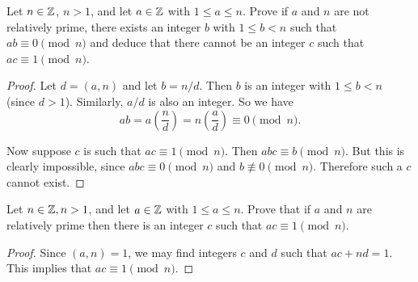    Let   $n\in\mathbb{Z}$,   $n>1$,   and   let   $a\in\mathbb{Z}$   with
$1\leq a\leq n$. Prove if $a$  and $n$ are not relatively prime, there
exists an integer  $b$ with $1\leq b<n$  such that $ab\equiv0\pmod{n}$
and  deduce   that  there   cannot  be  an   integer  $c$   such  that
$ac\equiv1\pmod{n}$.
\begin{proof}
  Let $d = (a, n)$ and let $b = n/d$. Then $b$ is an integer with
  $1\leq b<n$ (since $d > 1$). Similarly, $a/d$ is also an integer. So
  we have
  \begin{equation*}
    ab = a\left(\frac{n}{d}\right) = n\left(\frac{a}{d}\right) \equiv0\pmod{n}.
  \end{equation*}

  Now suppose $c$ is such that $ac\equiv1\pmod{n}$. Then
  $abc\equiv b\pmod{n}$. But this is clearly impossible, since
  $abc\equiv0\pmod{n}$ and $b\not\equiv0\pmod{n}$. Therefore such a
  $c$ cannot exist.
\end{proof}

 Let $n\in\mathbb{Z}, n > 1$, and let $a\in\mathbb{Z}$ with
$1\leq a\leq n$. Prove that if $a$ and $n$ are relatively prime then
there is an integer $c$ such that $ac\equiv1\pmod{n}$.
\begin{proof}
  Since $(a, n) = 1$, we may find integers $c$ and $d$ such that
  $ac + nd = 1$. This implies that $ac\equiv1\pmod{n}$.
\end{proof}

